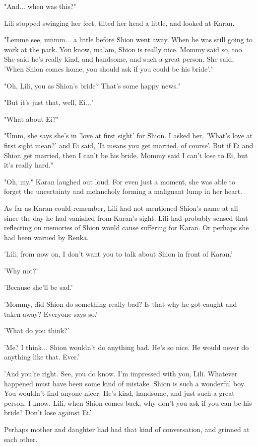 "And... when was this?"

Lili stopped swinging her feet, tilted her head a little, and looked at
Karan.

"Lemme see, ummm... a little before Shion went away. When he was still
going to work at the park. You know, ma'am, Shion is really nice. Mommy
said so, too. She said he's really kind, and handsome, and such a great
person. She said, 'When Shion comes home, you should ask if you could be
his bride'."

"Oh, Lili, you as Shion's bride? That's some happy news."

"But it's just that, well, Ei..."

"What about Ei?"

"Umm, she says she's in 'love at first sight' for Shion. I asked her,
'What's love at first sight mean?' and Ei said, 'It means you get
married, of course'. But if Ei and Shion get married, then I can't be
his bride. Mommy said I can't lose to Ei, but it's really hard."

"Oh, my." Karan laughed out loud. For even just a moment, she was able
to forget the uncertainty and melancholy forming a malignant lump in her
heart.

As far as Karan could remember, Lili had not mentioned Shion's name at
all since the day he had vanished from Karan's sight. Lili had probably
sensed that reflecting on memories of Shion would cause suffering for
Karan. Or perhaps she had been warned by Renka.

'Lili, from now on, I don't want you to talk about Shion in front of
Karan.'

'Why not?'

'Because she'll be sad.'

'Mommy, did Shion do something really bad? Is that why he got caught and
taken away? Everyone says so.'

'What do you think?'

'Me? I think... Shion wouldn't do anything bad. He's so nice. He would
never do anything like that. Ever.'

'And you're right. See, you do know. I'm impressed with you, Lili.
Whatever happened must have been some kind of mistake. Shion is such a
wonderful boy. You wouldn't find anyone nicer. He's kind, handsome, and
just such a great person. I know, Lili, when Shion comes back, why don't
you ask if you can be his bride? Don't lose against Ei.'

Perhaps mother and daughter had had that kind of conversation, and
grinned at each other.

